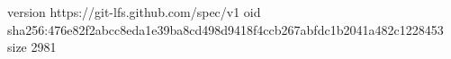 version https://git-lfs.github.com/spec/v1
oid sha256:476e82f2abcc8eda1e39ba8cd498d9418f4ccb267abfdc1b2041a482c1228453
size 2981
